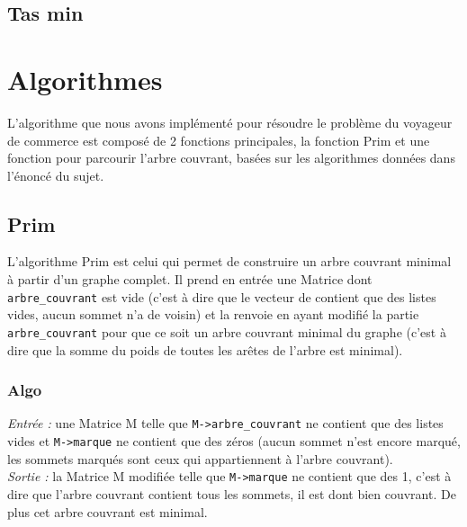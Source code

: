 \documentclass[a4paper,11pt]{article}
\begin{document}
\subsection{Tas min} %


\section{Algorithmes}

L'algorithme que nous avons implémenté pour résoudre le problème du voyageur de commerce est composé de 2 fonctions principales, la fonction Prim et une fonction pour parcourir l'arbre couvrant, basées sur les algorithmes données dans l'énoncé du sujet.\\

\subsection{Prim} %

L'algorithme Prim est celui qui permet de construire un arbre couvrant minimal à partir d'un graphe complet. Il prend en entrée une Matrice dont \texttt{arbre\_couvrant} est vide (c'est à dire que le vecteur de contient que des listes vides, aucun sommet n'a de voisin) et la renvoie en ayant modifié la partie \texttt{arbre\_couvrant} pour que ce soit un arbre couvrant minimal du graphe (c'est à dire que la somme du poids de toutes les arêtes de l'arbre est minimal).\\

\subsubsection*{Algo}

\textit{Entrée :} une Matrice M telle que \texttt{M->arbre\_couvrant} ne contient que des listes vides et \texttt{M->marque} ne contient que des zéros (aucun sommet n'est encore marqué, les sommets marqués sont ceux qui appartiennent à l'arbre couvrant).\\
\textit{Sortie :} la Matrice M modifiée telle que \texttt{M->marque} ne contient que des 1, c'est à dire que l'arbre couvrant contient tous les sommets, il est dont bien couvrant. De plus cet arbre couvrant est minimal.\\
\end{document}

